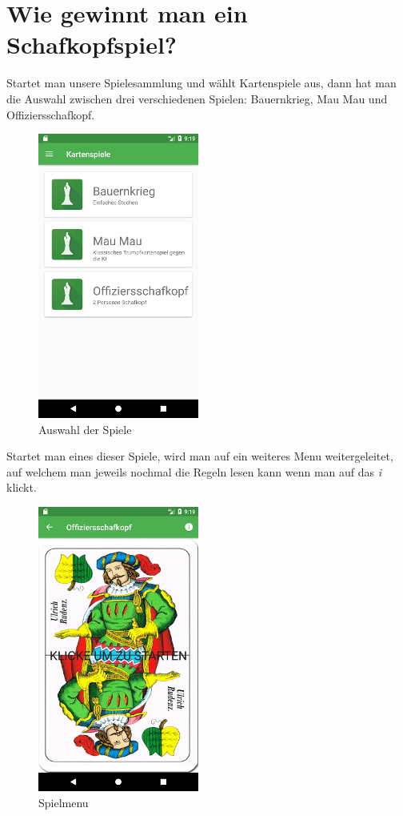 \section{Wie gewinnt man ein Schafkopfspiel?}
\sectionauthor{\philipp}
Startet man unsere Spielesammlung und wählt Kartenspiele aus, dann hat man die Auswahl zwischen drei verschiedenen Spielen: Bauernkrieg, Mau Mau und Offiziersschafkopf.
\begin{figure}[h]
	\centering
	\includegraphics{resources/kartenscreens/auswahl}
	\caption{Auswahl der Spiele}
\end{figure}
Startet man eines dieser Spiele, wird man auf ein weiteres Menu weitergeleitet, auf welchem man jeweils nochmal die Regeln lesen kann wenn man auf das \emph{i} klickt.
\begin{figure}[h]
	\centering
	\includegraphics{resources/kartenscreens/menu}
	\caption{Spielmenu}
\end{figure}
